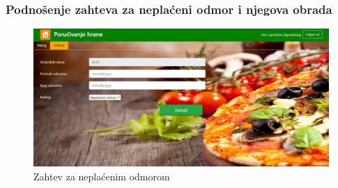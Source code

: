  \subsubsection{Podno\v senje zahteva za nepla\'ceni odmor i njegova obrada }
  \begin{figure}[!h]
    \includegraphics[width=1\textwidth]{slike/neplaceni_odmor.png}
    \caption{Zahtev za neplaćenim odmorom} %
    \label{fig:slika_neplaceni}
\end{figure} 
 

